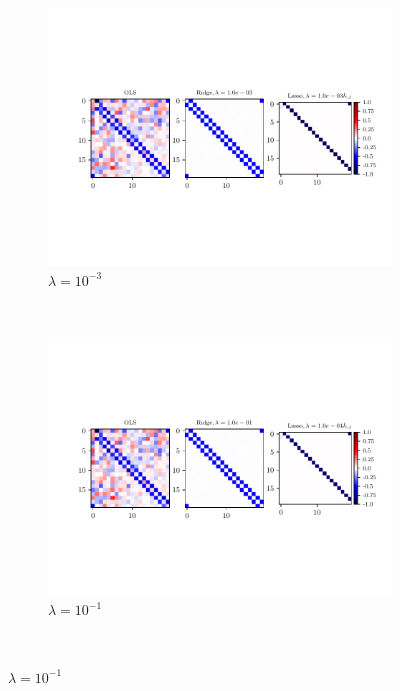\begin{figure}
    \centering
    \begin{subfigure}[b]{0.5\textwidth}
        \centering
        \includegraphics[scale=0.5]{../fig/regression_ising_1d_heatmap_lambda0.001.pdf}
        \caption{$\lambda=10^{-3}$}
        \label{fig:linreg-hm-1e-3}
    \end{subfigure} \\
    \begin{subfigure}[b]{0.5\textwidth}
        \centering
        \includegraphics[scale=0.5]{../fig/regression_ising_1d_heatmap_lambda0.1.pdf}
        \caption{$\lambda=10^{-1}$}
        \label{fig:linreg-hm-1e-1}
    \end{subfigure} \\

\end{figure}
